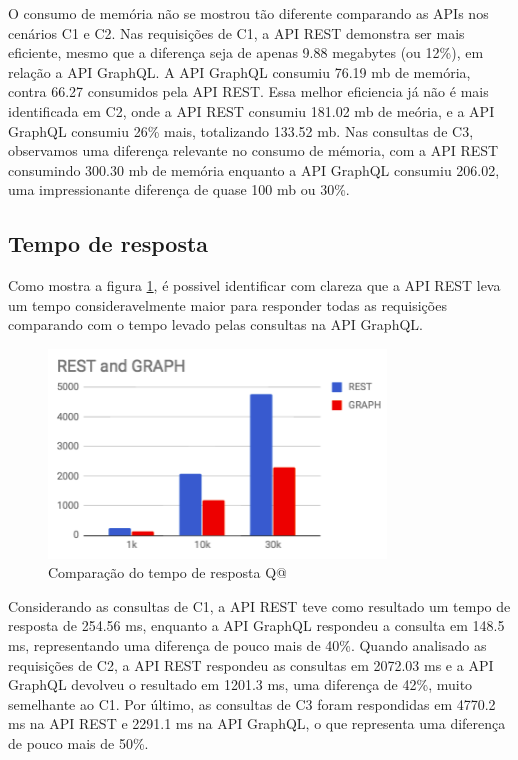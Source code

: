 O consumo de memória não se mostrou tão diferente comparando as APIs nos cenários C1 e C2. Nas requisições de C1, a API REST demonstra ser mais eficiente, mesmo que a diferença seja de apenas 9.88 megabytes (ou 12\%), em relação a API GraphQL. A API GraphQL consumiu 76.19 mb de memória, contra 66.27 consumidos pela API REST. Essa melhor eficiencia já não é mais identificada em C2, onde a API REST consumiu 181.02 mb de meória, e a API GraphQL consumiu 26\% mais, totalizando 133.52 mb. Nas consultas de C3, observamos uma diferença relevante no consumo de mémoria, com a API REST consumindo 300.30 mb de memória enquanto a API GraphQL consumiu 206.02, uma impressionante diferença de quase 100 mb ou 30\%.

\subsection{Tempo de resposta}

Como mostra a figura \ref{fig:q2-time}, é possivel identificar com clareza que a API REST leva um tempo consideravelmente maior para responder todas as requisições comparando com o tempo levado pelas consultas na API GraphQL.

\begin{figure}[htbp]
    \centering
    \includegraphics[width=0.8\textwidth]{figuras/Q2-result-request-time.png}
    \caption{Comparação do tempo de resposta Q@}
    \label{fig:q2-time}
    \author{fonte: Autor}
\end{figure}

Considerando as consultas de C1, a API REST teve como resultado um tempo de resposta de 254.56 ms, enquanto a API GraphQL respondeu a consulta em 148.5 ms, representando uma diferença de pouco mais de 40\%. Quando analisado as requisições de C2, a API REST respondeu as consultas em 2072.03 ms e a API GraphQL devolveu o resultado em 1201.3 ms, uma diferença de 42\%, muito semelhante ao C1. Por último, as consultas de C3 foram respondidas em 4770.2 ms na API REST e 2291.1 ms na API GraphQL, o que representa uma diferença de pouco mais de 50\%.

